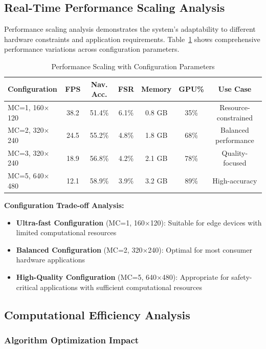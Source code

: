 \documentclass[12pt,oneside]{book}
\newcommand{\tabref}[1]{Table~\ref{#1}}
\begin{document}
\subsection{Real-Time Performance Scaling Analysis}

Performance scaling analysis demonstrates the system's adaptability to different hardware constraints and application requirements. \tabref{tab:performance_scaling_detailed} shows comprehensive performance variations across configuration parameters.

\begin{table}[ht]
\centering
\caption{Performance Scaling with Configuration Parameters}
\label{tab:performance_scaling_detailed}
\begin{tabular}{@{}lcccccc@{}}
\toprule
\textbf{Configuration} & \textbf{FPS} & \textbf{Nav. Acc.} & \textbf{FSR} & \textbf{Memory} & \textbf{GPU\%} & \textbf{Use Case} \\
\midrule
MC=1, 160$\times$120 & 38.2 & 51.4\% & 6.1\% & 0.8 GB & 35\% & Resource-constrained \\
MC=2, 320$\times$240 & 24.5 & 55.2\% & 4.8\% & 1.8 GB & 68\% & Balanced performance \\
MC=3, 320$\times$240 & 18.9 & 56.8\% & 4.2\% & 2.1 GB & 78\% & Quality-focused \\
MC=5, 640$\times$480 & 12.1 & 58.9\% & 3.9\% & 3.2 GB & 89\% & High-accuracy \\
\bottomrule
\end{tabular}
\end{table}

\textbf{Configuration Trade-off Analysis:}
\begin{itemize}
\item \textbf{Ultra-fast Configuration} (MC=1, 160$\times$120): Suitable for edge devices with limited computational resources
\item \textbf{Balanced Configuration} (MC=2, 320$\times$240): Optimal for most consumer hardware applications
\item \textbf{High-Quality Configuration} (MC=5, 640$\times$480): Appropriate for safety-critical applications with sufficient computational resources
\end{itemize}

\subsection{Computational Efficiency Analysis}

\subsubsection{Algorithm Optimization Impact}
\end{document}
